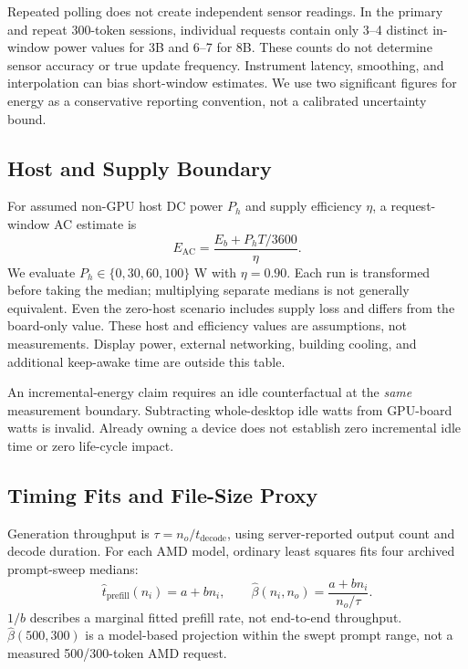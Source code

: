 \documentclass[conference]{IEEEtran}
\begin{document}
Repeated polling does not create independent sensor readings.
In the primary and repeat 300-token sessions, individual requests
contain only 3--4 distinct in-window power values for 3B and 6--7 for 8B.
These counts do not determine sensor accuracy or true update frequency.
Instrument latency, smoothing, and interpolation can bias short-window
estimates. We use two significant figures for energy as a conservative
reporting convention, not a calibrated uncertainty bound.

\subsection{Host and Supply Boundary}
For assumed non-GPU host DC power $P_h$ and supply efficiency $\eta$,
a request-window AC estimate is
\begin{equation}
E_{\mathrm{AC}}=\frac{E_b+P_hT/3600}{\eta}. \label{eq:wall}
\end{equation}
We evaluate $P_h\in\{0,30,60,100\}$ W with $\eta=0.90$.
Each run is transformed before taking the median; multiplying separate
medians is not generally equivalent. Even the zero-host scenario includes
supply loss and differs from the board-only value.
These host and efficiency values are assumptions, not measurements.
Display power, external networking, building cooling, and additional
keep-awake time are outside this table.

An incremental-energy claim requires an idle counterfactual at the
\emph{same} measurement boundary. Subtracting whole-desktop idle watts
from GPU-board watts is invalid. Already owning a device does not establish
zero incremental idle time or zero life-cycle impact.

\subsection{Timing Fits and File-Size Proxy}
Generation throughput is $\tau=n_o/t_{\mathrm{decode}}$, using
server-reported output count and decode duration. For each AMD model,
ordinary least squares fits four archived prompt-sweep medians:
\begin{equation}
\widehat{t}_{\mathrm{prefill}}(n_i)=a+bn_i,\qquad
\widehat{\beta}(n_i,n_o)=\frac{a+bn_i}{n_o/\tau}. \label{eq:prefill}
\end{equation}
$1/b$ describes a marginal fitted prefill rate, not end-to-end throughput.
$\widehat{\beta}(500,300)$ is a model-based projection within the swept
prompt range, not a measured 500/300-token AMD request.
\end{document}
